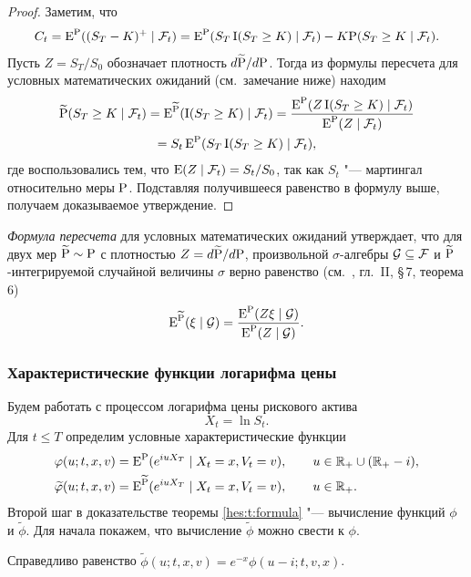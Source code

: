 \begin{proof}
Заметим, что
\[
C_t = \E^\P((S_T - K)^+\mid \F_t) = \E^\P(S_T \I(S_T\ge K) \mid \F_t) - K\P(S_T\ge K\mid \F_t).
\]
Пусть $Z = S_T/S_0$ обозначает плотность $d\tilde\P/d\P$. 
Тогда из формулы пересчета для условных математических ожиданий (см.~замечание ниже) находим
\begin{multline*}
\tilde\P(S_T\ge K\mid \F_t) = \E^{\tilde\P} (\I(S_T \ge K) \mid \F_t)
= \frac{\E^{\P}(Z \I(S_T \ge K)\mid \F_t)}{\E^{\P}(Z\mid \F_t)} \\= S_t \E^{\P}(S_T \I(S_T\ge K)\mid \F_t),
\end{multline*}
где воспользовались тем, что $\E(Z\mid \F_t) = S_t/S_0$, так как $S_t$ "--- мартингал относительно меры $\P$.
Подставляя получившееся равенство в формулу выше, получаем доказываемое утверждение.
\end{proof}

\begin{remark}
\emph{Формула пересчета} для условных математических ожиданий утверждает, что для двух мер $\tilde\P \sim \P$ с плотностью $Z=d\tilde\P/d\P$, произвольной $\sigma$-алгебры $\G\subseteq\F$ и $\tilde\P$-интегрируемой случайной величины $\sigma$ верно равенство (см.~\cite{Shiryaev04}, гл.~II, \S\,7, теорема 6)
\[
\E^{\tilde \P}(\xi\mid \G) = \frac{\E^{\P}(Z\xi\mid \G)}{\E^\P(Z\mid \G)}.
\]
\end{remark}


\subsubsection{Характеристические функции логарифма цены}

Будем работать с процессом логарифма цены рискового актива
\[
X_t = \ln S_t.
\]
Для $t\le T$ определим условные характеристические функции
\begin{align*}
&\phi(u; t,x,v) = \E^{\P} (e^{iu X_T} \mid X_t=x, V_t = v), \qquad u\in\R_+ \cup (\R_+-i),\\
&\tilde\phi(u; t,x,v) = \E^{\tilde\P} (e^{iu X_T} \mid X_t=x, V_t = v), \qquad u\in\R_+ .
\end{align*}
Второй шаг в доказательстве теоремы \ref{hes:t:formula} "--- вычисление функций $\phi$ и $\tilde\phi$.
Для начала покажем, что вычисление $\tilde\phi$ можно свести к $\phi$.

\begin{lemma}
Справедливо равенство $\tilde \phi(u; t,x,v) = e^{-x}\phi(u-i;t,v,x)$.
\end{lemma}

